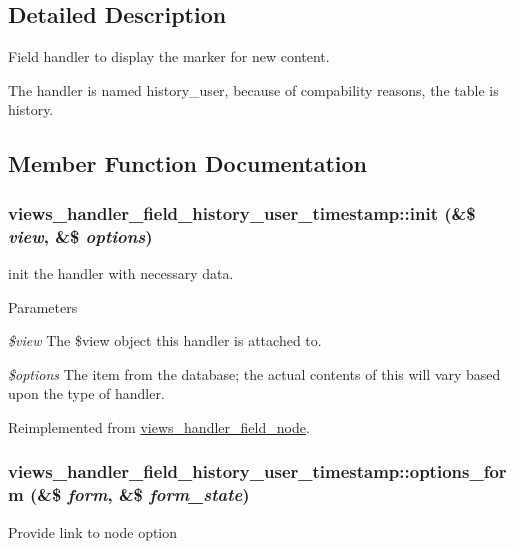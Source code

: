 \subsection{Detailed Description}
Field handler to display the marker for new content.

The handler is named history\_\-user, because of compability reasons, the table is history. 

\subsection{Member Function Documentation}
\hypertarget{classviews__handler__field__history__user__timestamp_addc2c91173eae704e1283e726c6f15d0}{
\subsubsection[{init}]{\setlength{\rightskip}{0pt plus 5cm}views\_\-handler\_\-field\_\-history\_\-user\_\-timestamp::init (\&\$ {\em view}, \/  \&\$ {\em options})}}
\label{classviews__handler__field__history__user__timestamp_addc2c91173eae704e1283e726c6f15d0}
init the handler with necessary data. 
\begin{DoxyParams}{Parameters}
\item[{\em \$view}]The \$view object this handler is attached to. \item[{\em \$options}]The item from the database; the actual contents of this will vary based upon the type of handler. \end{DoxyParams}


Reimplemented from \hyperlink{classviews__handler__field__node_a4f263bde5682e4c2285a0e51a7f8b472}{views\_\-handler\_\-field\_\-node}.\hypertarget{classviews__handler__field__history__user__timestamp_a785f6784b015c681b25f58573b1e6859}{
\subsubsection[{options\_\-form}]{\setlength{\rightskip}{0pt plus 5cm}views\_\-handler\_\-field\_\-history\_\-user\_\-timestamp::options\_\-form (\&\$ {\em form}, \/  \&\$ {\em form\_\-state})}}
\label{classviews__handler__field__history__user__timestamp_a785f6784b015c681b25f58573b1e6859}
Provide link to node option 

